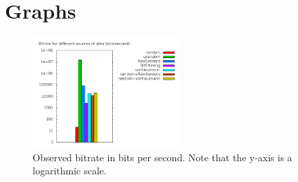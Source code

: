 \documentclass[conference]{IEEEtran}
\begin{document}

%
%
%





\appendix
\section{Graphs}

\begin{figure}[h]
	\centering
	\includegraphics[width=0.5\textwidth]{bitrate.png}
	\caption{Observed bitrate in bits per second.  Note that the y-axis is 
a logarithmic scale.}
	\label{fig:bitrates}
\end{figure}

\end{document}
